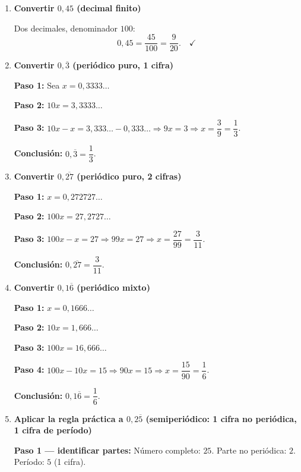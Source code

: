 \documentclass[11pt, letterpaper]{article}
\begin{document}
\begin{tcolorbox}[examplebox, title={Ejemplos --- Convertir decimal a fracci\'on}]
\begin{enumerate}[label=\textbf{Ej. \arabic*.}, leftmargin=*, itemsep=16pt]

\item \textbf{Convertir $0{,}45$ (decimal finito)}

Dos decimales, denominador $100$:
$$0{,}45=\frac{45}{100}=\frac{9}{20}. \quad\checkmark$$

\item \textbf{Convertir $0{,}\overline{3}$ (peri\'odico puro, 1 cifra)}

\textbf{Paso 1:} Sea $x=0{,}3333\ldots$

\medskip
\textbf{Paso 2:} $10x=3{,}3333\ldots$

\medskip
\textbf{Paso 3:} $10x-x=3{,}333\ldots-0{,}333\ldots \Rightarrow 9x=3 \Rightarrow x=\dfrac{3}{9}=\dfrac{1}{3}$.

\medskip
\textbf{Conclusi\'on:} $0{,}\overline{3}=\dfrac{1}{3}$. \checkmark

\item \textbf{Convertir $0{,}\overline{27}$ (peri\'odico puro, 2 cifras)}

\textbf{Paso 1:} $x=0{,}272727\ldots$

\medskip
\textbf{Paso 2:} $100x=27{,}2727\ldots$

\medskip
\textbf{Paso 3:} $100x-x=27 \Rightarrow 99x=27 \Rightarrow x=\dfrac{27}{99}=\dfrac{3}{11}$.

\medskip
\textbf{Conclusi\'on:} $0{,}\overline{27}=\dfrac{3}{11}$. \checkmark

\item \textbf{Convertir $0{,}1\overline{6}$ (peri\'odico mixto)}

\textbf{Paso 1:} $x=0{,}1666\ldots$

\medskip
\textbf{Paso 2:} $10x=1{,}666\ldots$

\medskip
\textbf{Paso 3:} $100x=16{,}666\ldots$

\medskip
\textbf{Paso 4:} $100x-10x=15 \Rightarrow 90x=15 \Rightarrow x=\dfrac{15}{90}=\dfrac{1}{6}$.

\medskip
\textbf{Conclusi\'on:} $0{,}1\overline{6}=\dfrac{1}{6}$. \checkmark

\item \textbf{Aplicar la regla pr\'actica a $0{,}2\overline{5}$ (semiperiódico: 1 cifra no periódica, 1 cifra de período)}

\textbf{Paso 1 --- identificar partes:}
Número completo: $25$. Parte no periódica: $2$. Período: $5$ (1 cifra).


\end{enumerate}
\end{tcolorbox}
\end{document}
